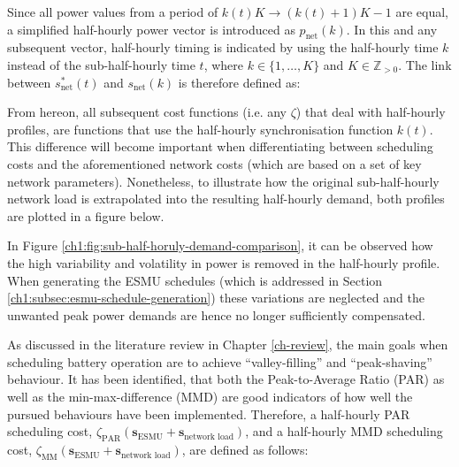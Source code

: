 

Since all power values from a period of $k(t)K \rightarrow (k(t)+1)K-1$ are equal, a simplified half-hourly power vector is introduced as $p_\text{net}(k)$. 
In this and any subsequent vector, half-hourly timing is indicated by using the half-hourly time $k$ instead of the sub-half-hourly time $t$, where $k \in \{1, \dots, K\}$ and $K \in \mathbb{Z}_{>0}$.
The link between $s^{*}_\text{net}(t)$ and $s_\text{net}(k)$ is therefore defined as:



From hereon, all subsequent cost functions (i.e. any $\zeta$) that deal with half-hourly profiles, are functions that use the half-hourly synchronisation function $k(t)$.
This difference will become important when differentiating between scheduling costs and the aforementioned network costs (which are based on a set of key network parameters).
Nonetheless, to illustrate how the original sub-half-hourly network load is extrapolated into the resulting half-hourly demand, both profiles are plotted in a figure below.



In Figure \ref{ch1:fig:sub-half-horuly-demand-comparison}, it can be observed how the high variability and volatility in power is removed in the half-hourly profile.
When generating the ESMU schedules (which is addressed in Section \ref{ch1:subsec:esmu-schedule-generation}) these variations are neglected and the unwanted peak power demands are hence no longer sufficiently compensated.


As discussed in the literature review in Chapter \ref{ch-review}, the main goals when scheduling battery operation are to achieve ``valley-filling'' and ``peak-shaving'' behaviour.
It has been identified, that both the Peak-to-Average Ratio (PAR) as well as the min-max-difference (MMD) are good indicators of how well the pursued behaviours have been implemented.
Therefore, a half-hourly PAR scheduling cost, $\zeta_\text{PAR}(\textbf{s}_\text{ESMU} + \textbf{s}_\text{network load})$, and a half-hourly MMD scheduling cost, $\zeta_\text{MM}(\textbf{s}_\text{ESMU} + \textbf{s}_\text{network load})$, are defined as follows:





